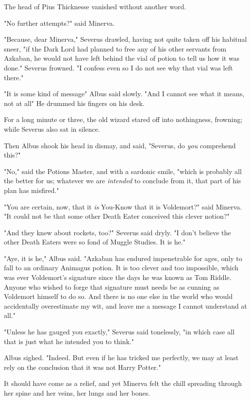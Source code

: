 The head of Pius Thicknesse vanished without another word.

"No further attempts\el?" said Minerva.

"Because, dear Minerva," Severus drawled, having not quite taken off his
habitual sneer, "if the Dark Lord had planned to free any of his other servants
from Azkaban, he would not have left behind the vial of potion to tell us how
it was done." Severus frowned. "I confess{\el} even so I do not see why that
vial was left there."

"It is some kind of message{\el}" Albus said slowly. "And I cannot see what
it means, not at all{\el}" He drummed his fingers on his desk.

For a long minute or three, the old wizard stared off into nothingness,
frowning; while Severus also sat in silence.

Then Albus shook his head in dismay, and said, "Severus, do \emph{you}
comprehend this?"

"No," said the Potions Master, and with a sardonic smile, "which is probably
all the better for us; whatever we are \emph{intended} to conclude from it,
that part of his plan has misfired."

"You are certain, now, that it \emph{is} You-Know{\el} that it is
Voldemort?" said Minerva. "It could not be that some other Death Eater
conceived this clever notion?"

"And they knew about rockets, too?" Severus said dryly. "I don't believe the
other Death Eaters were so fond of Muggle Studies. It is he."

"Aye, it is he," Albus said. "Azkaban has endured impenetrable for ages, only
to fall to an ordinary Animagus potion. It is too clever and too impossible,
which was ever Voldemort's signature since the days he was known as Tom Riddle.
Anyone who wished to forge that signature must needs be as cunning as Voldemort
himself to do so. And there is no one else in the world who would accidentally
overestimate my wit, and leave me a message I cannot understand at all."

"Unless he has gauged you exactly," Severus said tonelessly, "in which case all
that is just what he intended you to think."

Albus sighed. "Indeed. But even if he has tricked me perfectly, we may at least
rely on the conclusion that it was not Harry Potter."

It should have come as a relief, and yet Minerva felt the chill spreading
through her spine and her veins, her lungs and her bones.

